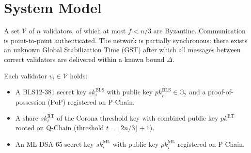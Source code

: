 \section{System Model}

\label{sec:model}

\begin{definition}[Network]
A set $\mathcal{V}$ of $n$ validators, of which at most $f < n/3$ are
Byzantine. Communication is point-to-point authenticated. The network is
partially synchronous: there exists an unknown Global Stabilization Time
(GST) after which all messages between correct validators are delivered
within a known bound $\Delta$.
\end{definition}

\begin{definition}
\label{def:keys}
Each validator $v_i \in \mathcal{V}$ holds:
\begin{itemize}[leftmargin=2em]
\item A BLS12-381 secret key $\mathit{sk}_i^{\mathrm{BLS}}$ with public
      key $\mathit{pk}_i^{\mathrm{BLS}} \in \mathbb{G}_2$ and a
      proof-of-possession (PoP) registered on P-Chain.
\item A share $\mathit{sk}_i^{\mathrm{RT}}$ of the Corona threshold key
      with combined public key $\mathit{pk}^{\mathrm{RT}}$ rooted on
      Q-Chain (threshold $t = \lfloor 2n/3 \rfloor + 1$).
\item An ML-DSA-65 secret key $\mathit{sk}_i^{\mathrm{ML}}$ with public
      key $\mathit{pk}_i^{\mathrm{ML}}$ registered on P-Chain.
\end{itemize}
\end{definition}

